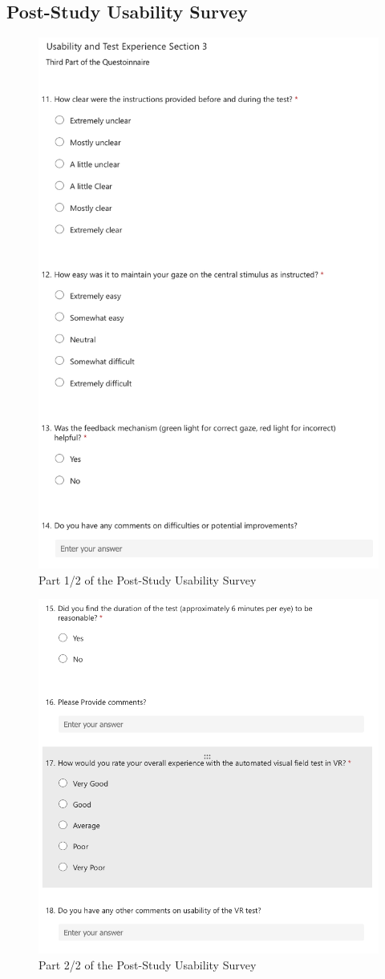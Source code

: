\documentclass{l4proj}
\begin{document}
\begin{appendices}
\subsection{Post-Study Usability Survey} \label{appendix:US_part_3}
\begin{figure}[htbp]
    \centering
    \includegraphics[width=0.7\linewidth]{dissertation/images/US_Part3_1.png}   
    \caption{Part 1/2 of the Post-Study Usability Survey}
\end{figure}
\begin{figure}[htbp]
    \centering
    \includegraphics[width=0.9\linewidth]{dissertation/images/US_Part3_2.png}   
    \caption{Part 2/2 of the Post-Study Usability Survey}
\end{figure}
\newpage

\end{appendices}
\end{document}
